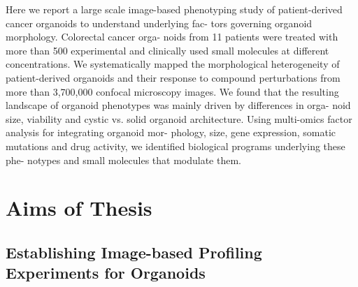 \begin{flushleft}
Here we report a large scale image-based phenotyping study of patient-derived cancer organoids to understand underlying fac- tors governing organoid morphology. Colorectal cancer orga- noids from 11 patients were treated with more than 500 experimental and clinically used small molecules at different concentrations. We systematically mapped the morphological heterogeneity of patient-derived organoids and their response to compound perturbations from more than 3,700,000 confocal microscopy images. We found that the resulting landscape of organoid phenotypes was mainly driven by differences in orga- noid size, viability and cystic vs. solid organoid architecture. Using multi-omics factor analysis for integrating organoid mor- phology, size, gene expression, somatic mutations and drug activity, we identified biological programs underlying these phe- notypes and small molecules that modulate them.

\section{Aims of Thesis}
\subsection{Establishing Image-based Profiling Experiments for Organoids}


\end{flushleft}
